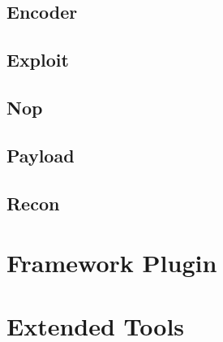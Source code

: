 \documentclass{report}
\begin{document}
        \subsection{Encoder}
        \subsection{Exploit}
        \subsection{Nop}
        \subsection{Payload}
        \subsection{Recon}
    \section{Framework Plugin}
    \section{Extended Tools}
\end{document}

